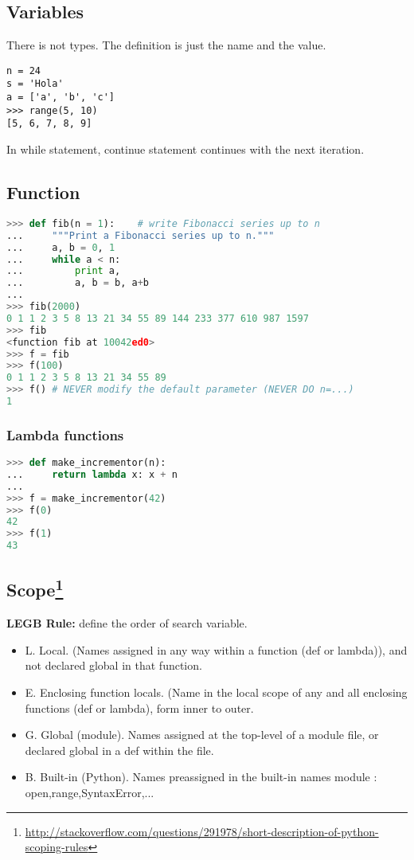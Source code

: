 \documentclass[fleqn,10pt]{SelfArx} %
\begin{document}
	\subsection{Variables}
	There is not types. The definition is just the name and the value.

	\begin{lstlisting}
n = 24
s = 'Hola'
a = ['a', 'b', 'c']
>>> range(5, 10)
[5, 6, 7, 8, 9]
	\end{lstlisting}
In while statement, continue statement continues with the next iteration.  

	\subsection{Function}
	
	\begin{lstlisting}[language=Python, basicstyle=\scriptsize]
>>> def fib(n = 1):    # write Fibonacci series up to n
...     """Print a Fibonacci series up to n."""
...     a, b = 0, 1
...     while a < n:
...         print a,
...         a, b = b, a+b
...
>>> fib(2000)
0 1 1 2 3 5 8 13 21 34 55 89 144 233 377 610 987 1597
>>> fib
<function fib at 10042ed0>
>>> f = fib
>>> f(100)
0 1 1 2 3 5 8 13 21 34 55 89
>>> f() # NEVER modify the default parameter (NEVER DO n=...) 
1
	\end{lstlisting}
	\subsubsection{Lambda functions}
	\begin{lstlisting}[language=Python, basicstyle=\scriptsize]
>>> def make_incrementor(n):
...     return lambda x: x + n
...
>>> f = make_incrementor(42)
>>> f(0)
42
>>> f(1)
43
	\end{lstlisting}

	\subsection[Scope]{Scope\footnote{\url{http://stackoverflow.com/questions/291978/short-description-of-python-scoping-rules}}}
	
	\textbf{LEGB Rule:} define the order of search variable.
	\begin{itemize}
		\item L. Local. (Names assigned in any way within a function (def or lambda)), and not declared global in that function.
		
		\item E. Enclosing function locals. (Name in the local scope of any and all enclosing functions (def or lambda), form inner to outer.
		
		\item G. Global (module). Names assigned at the top-level of a module file, or declared global in a def within the file.
		
		\item B. Built-in (Python). Names preassigned in the built-in names module : open,range,SyntaxError,...
	\end{itemize}
	
\end{document}
